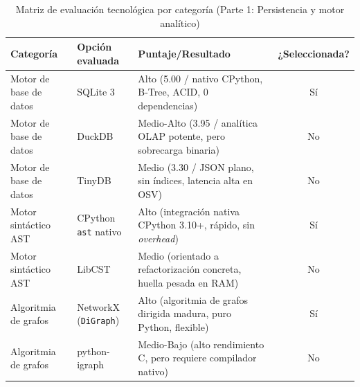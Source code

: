 \begin{table}[H]
\centering
\caption{Matriz de evaluación tecnológica por categoría (Parte 1: Persistencia y motor analítico)}
\label{p5:tab:evaluacion_tecnologica_categoria_p1}
\small
{}
\begin{tabularx}{\textwidth}{p{3.4cm} p{3.2cm} X c}
\toprule
\textbf{Categoría} & \textbf{Opción evaluada} & \textbf{Puntaje/Resultado} & \textbf{¿Seleccionada?} \\
\midrule
Motor de base de datos & SQLite 3 & Alto (5.00 / nativo CPython, B-Tree, ACID, 0 dependencias) & Sí \\
Motor de base de datos & DuckDB & Medio-Alto (3.95 / analítica OLAP potente, pero sobrecarga binaria) & No \\
Motor de base de datos & TinyDB & Medio (3.30 / JSON plano, sin índices, latencia alta en OSV) & No \\
\addlinespace
Motor sintáctico AST & CPython \texttt{ast} nativo & Alto (integración nativa CPython 3.10+, rápido, sin \textit{overhead}) & Sí \\
Motor sintáctico AST & LibCST & Medio (orientado a refactorización concreta, huella pesada en RAM) & No \\
\addlinespace
Algoritmia de grafos & NetworkX (\texttt{DiGraph}) & Alto (algoritmia de grafos dirigida madura, puro Python, flexible) & Sí \\
Algoritmia de grafos & python-igraph & Medio-Bajo (alto rendimiento C, pero requiere compilador nativo) & No \\
\bottomrule
\end{tabularx}
\end{table}

